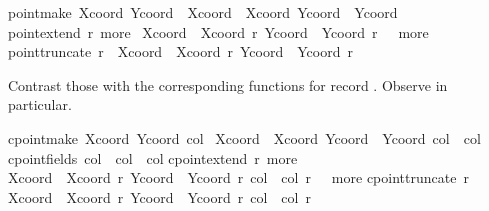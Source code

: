 \begin{isabellebody}
\begin{isamarkuptext}
  \begin{isabelle}%
point{}make\ Xcoord\ Ycoord\ {}\ {}Xcoord\ {}\ Xcoord{}\ Ycoord\ {}\ Ycoord{}\isasep\isanewline%
point{}extend\ r\ more\ {}\isanewline
{}Xcoord\ {}\ Xcoord\ r{}\ Ycoord\ {}\ Ycoord\ r{}\ {}\ {}\ more{}\isasep\isanewline%
point{}truncate\ r\ {}\ {}Xcoord\ {}\ Xcoord\ r{}\ Ycoord\ {}\ Ycoord\ r{}%
\end{isabelle}
  Contrast those with the corresponding functions for record .  Observe  in particular.
  \begin{isabelle}%
cpoint{}make\ Xcoord\ Ycoord\ col\ {}\isanewline
{}Xcoord\ {}\ Xcoord{}\ Ycoord\ {}\ Ycoord{}\ col\ {}\ col{}\isasep\isanewline%
cpoint{}fields\ col\ {}\ {}col\ {}\ col{}\isasep\isanewline%
cpoint{}extend\ r\ more\ {}\isanewline
{}Xcoord\ {}\ Xcoord\ r{}\ Ycoord\ {}\ Ycoord\ r{}\ col\ {}\ col\ r{}\ {}\ {}\ more{}\isasep\isanewline%
cpoint{}truncate\ r\ {}\isanewline
{}Xcoord\ {}\ Xcoord\ r{}\ Ycoord\ {}\ Ycoord\ r{}\ col\ {}\ col\ r{}%
\end{isabelle}


\end{isamarkuptext}
\end{isabellebody}
